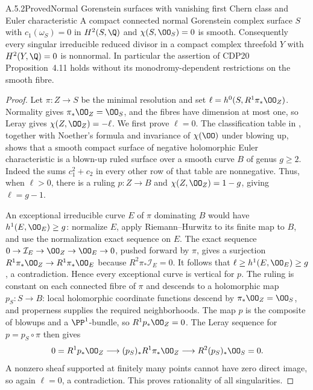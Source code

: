 \begin{statement}{A.5.2}{Proved}{Normal Gorenstein surfaces with vanishing first Chern class and Euler characteristic}
A compact connected normal Gorenstein complex surface $S$ with $c_1(\omega_S)=0$ in $H^2(S,\Q)$ and $\chi(S,\OO_S)=0$ is smooth. Consequently every singular irreducible reduced divisor in a compact complex threefold $Y$ with $H^2(Y,\Q)=0$ is nonnormal. In particular the assertion of CDP20 Proposition~4.11 holds without its monodromy-dependent restrictions on the smooth fibre.
\end{statement}
\begin{proof}
Let $\pi:Z\to S$ be the minimal resolution and set $\ell=h^0(S,R^1\pi_*\OO_Z)$. Normality gives $\pi_*\OO_Z=\OO_S$, and the fibres have dimension at most one, so Leray gives $\chi(Z,\OO_Z)=-\ell$. We first prove $\ell=0$. The classification table in \cite[Theorem~2.2]{Peters2021}, together with Noether's formula and invariance of $\chi(\OO)$ under blowing up, shows that a smooth compact surface of negative holomorphic Euler characteristic is a blown-up ruled surface over a smooth curve $B$ of genus $g\ge2$. Indeed the sums $c_1^2+c_2$ in every other row of that table are nonnegative. Thus, when $\ell>0$, there is a ruling $p:Z\to B$ and $\chi(Z,\OO_Z)=1-g$, giving $\ell=g-1$.

An exceptional irreducible curve $E$ of $\pi$ dominating $B$ would have $h^1(E,\OO_E)\ge g$: normalize $E$, apply Riemann--Hurwitz to its finite map to $B$, and use the normalization exact sequence on $E$. The exact sequence $0\to\mathcal I_E\to\OO_Z\to\OO_E\to0$, pushed forward by $\pi$, gives a surjection $R^1\pi_*\OO_Z\to R^1\pi_*\OO_E$ because $R^2\pi_*\mathcal I_E=0$. It follows that $\ell\ge h^1(E,\OO_E)\ge g$, a contradiction. Hence every exceptional curve is vertical for $p$. The ruling is constant on each connected fibre of $\pi$ and descends to a holomorphic map $p_S:S\to B$: local holomorphic coordinate functions descend by $\pi_*\OO_Z=\OO_S$, and properness supplies the required neighborhoods. The map $p$ is the composite of blowups and a $\PP^1$-bundle, so $R^1p_*\OO_Z=0$. The Leray sequence for $p=p_S\circ\pi$ then gives
\[
0=R^1p_*\OO_Z\longrightarrow (p_S)_*R^1\pi_*\OO_Z
 \longrightarrow R^2(p_S)_*\OO_S=0.
\]
A nonzero sheaf supported at finitely many points cannot have zero direct image, so again $\ell=0$, a contradiction. This proves rationality of all singularities.


\end{proof}

